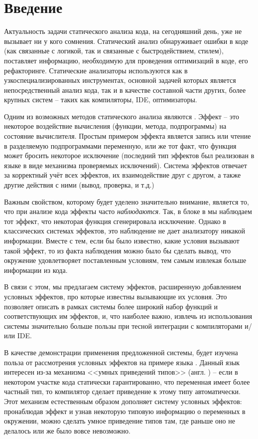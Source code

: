 \section*{Введение}

Актуальность задачи статического анализа кода, на сегодняшний день, уже не вызывает ни у кого сомнения. Статический анализ обнаруживает ошибки в коде (как связанные с логикой, так и связанные с быстродействием, стилем), поставляет информацию, необходимую для проведения оптимизаций в коде, его рефакторинге. Статические анализаторы используются как в узкоспециализированных инструментах, основной задачей которых является непосредственный анализ кода, так и в качестве составной части других, более крупных систем -- таких как компиляторы, IDE, оптимизаторы.

Одним из возможных методов статического анализа являются . Эффект -- это некоторое воздействие вычисления (функции, метода, подпрограммы) на состояние вычислителя. Простым примером эффекта является запись или чтение в разделяемую подпрограммами переменную, или же тот факт, что функция может бросить некоторое исключение (последний тип эффектов был реализован в языке  в виде механизма проверяемых исключений). Система эффектов отвечает за корректный учёт всех эффектов, их взаимодействие друг с другом, а также другие действия с ними (вывод, проверка, и т.д.)

Важным свойством, которому будет уделено значительно внимание, является то, что при анализе кода эффекты часто \textit{наблюдаются}. Так, в блоке  в  мы наблюдаем тот эффект, что некоторая функция сгенерировала исключение. Однако в классических системах эффектов, это наблюдение не дает анализатору никакой информации. Вместе с тем, если бы было известно, какие условия вызывают такой эффект, то из факта наблюдения можно было бы сделать вывод, что окружение удовлетворяет поставленным условиям, тем самым извлекая больше информации из кода. 

В связи с этом, мы предлагаем систему эффектов, расширенную добавлением условных эффектов, про которые известны вызывающие их условия. Это позволяет описать в рамках системы более широкий набор функций и соответствующих им эффектов, и, что наиболее важно, извлечь из использования системы значительно больше пользы при тесной интеграции с компиляторами и/или IDE. 

В качестве демонстрации применения предложенной системы, будет изучена польза от рассмотрения условных эффектов на примере языка . Данный язык интересен из-за механизма <<умных приведений типов>> (англ. ) -- если в некотором участке кода статически гарантированно, что переменная имеет более частный тип, то компилятор сделает приведение к этому типу автоматически. Этот механизм естественным образом дополняет систему условных эффектов: пронаблюдав эффект и узнав некоторую типовую информацию о переменных в окружении, можно сделать умное приведение типов там, где раньше оно не делалось или же было вовсе невозможно. 

